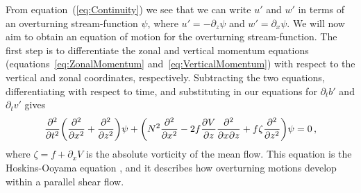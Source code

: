    From equation~(\ref{eq:Continuity}) we see that we can write $u'$ and $w'$ in terms of an overturning stream-function $\psi$, where $u' = - \partial_z \psi$ and $w' = \partial_x \psi$. We will now aim to obtain an equation of motion for the overturning stream-function. The first step is to differentiate the zonal and vertical momentum equations (equations~\ref{eq:ZonalMomentum} and~\ref{eq:VerticalMomentum}) with respect to the vertical and zonal coordinates, respectively. Subtracting the two equations, differentiating with respect to time, and substituting in our equations for $\partial_t b'$ and $\partial_t v'$ gives
    \begin{equation}
    \label{eq:OriginalHoskins}
    \pdv[2]{}{t} \bigg(\pdv[2]{}{x} + \pdv[2]{}{z}\bigg) \psi + \bigg( N^2 \pdv[2]{}{x} - 2 f \pdv{V}{z} \pdv[2]{}{x}{z} + f \zeta \pdv[2]{}{z} \bigg) \psi = 0 \, ,
    \end{equation}
    where $\zeta = f + \partial_x V$ is the absolute vorticity of the mean flow. This equation is the Hoskins-Ooyama equation \citep{Hoskins1974, Ooyama1966}, and it describes how overturning motions develop within a parallel shear flow.
    
